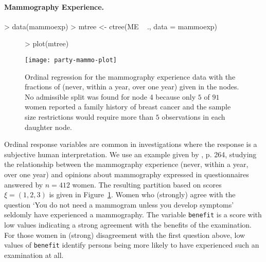 \documentclass[letter]{article}
\begin{document}
\paragraph{Mammography Experience.}

\begin{Schunk}
\begin{Sinput}
> data(mammoexp)
> mtree <- ctree(ME ~ ., data = mammoexp)
\end{Sinput}
\end{Schunk}

\begin{figure}[t]
\begin{center}
\begin{Schunk}
\begin{Sinput}
> plot(mtree)
\end{Sinput}
\end{Schunk}
\texttt{[image: party-mammo-plot]}
\caption{Ordinal regression for the mammography experience data with the
fractions of (never, within a year, over one year) given in the nodes.
No admissible split was found for node 4 because only $5$ of $91$ women reported 
a family history of breast cancer and the sample size restrictions would 
require more than $5$ observations in each daughter node. \label{mammoexp}}
\end{center}
\end{figure}


Ordinal response variables are common in investigations where the response
is a subjective human interpretation. 
We use an example given by \cite{HosmerLemeshow2000}, p. 264, 
studying the relationship between the mammography experience (never,
within a year, over one year) and opinions about mammography expressed in
questionnaires answered by $n = 412$ women. The resulting partition based on
scores $\xi = (1,2,3)$ is given in Figure~\ref{mammoexp}. 
Women who (strongly) agree with the question `You do not need a mammogram unless
you develop symptoms' seldomly have experienced a mammography. The variable
\texttt{benefit} is a score with low values indicating a strong agreement with the
benefits of the examination. For those women in (strong) disagreement with the first
question above, low values of \texttt{benefit} identify persons being more likely to have 
experienced such an examination at all. 




\end{document}
